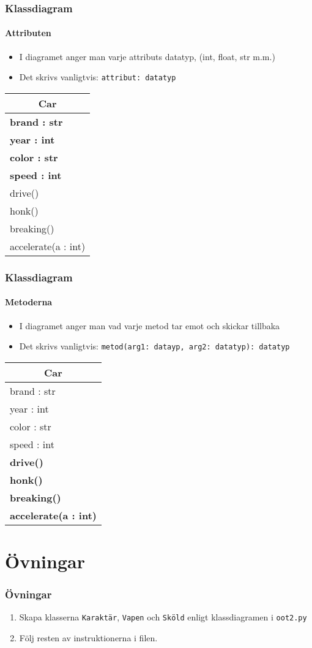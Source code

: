 \documentclass[aspectratio=169]{beamer}
\begin{document}
\begin{frame}
	\frametitle{Klassdiagram}
	\framesubtitle{Attributen}
	
	\begin{itemize}
		\item I diagramet anger man varje attributs datatyp, (int, float, str m.m.)
		\item Det skrivs vanligtvis: \texttt{attribut: datatyp}
	\end{itemize}
	
	\centering
	\begin{tabular}{|l|}
		\hline
		\multicolumn{1}{|c|}{\textbf{Car}} \\
		\hline
		\textbf{brand : str}\\
		\textbf{year : int}\\
		\textbf{color : str}\\
		\textbf{speed : int}\\ \hline
		drive() \\
		honk() \\
		breaking() \\
		accelerate(a : int)\\ \hline
	\end{tabular}
	

\end{frame}

\begin{frame}
	\frametitle{Klassdiagram}
	\framesubtitle{Metoderna}
	
	\begin{itemize}
		\item I diagramet anger man vad varje metod tar emot och skickar tillbaka
		\item Det skrivs vanligtvis: \texttt{metod(arg1: datayp, arg2: datatyp): datatyp}
	\end{itemize}
	
	\centering
	\begin{tabular}{|l|}
		\hline
		\multicolumn{1}{|c|}{\textbf{Car}} \\
		\hline
		brand : str\\
		year : int\\
		color : str\\
		speed : int\\ \hline
		\textbf{drive()} \\
		\textbf{honk()} \\
		\textbf{breaking()} \\
		\textbf{accelerate(a : int)}\\ \hline
	\end{tabular}
	

\end{frame}

\section{Övningar}

\begin{frame}
\frametitle{Övningar}

\begin{enumerate}
	\item Skapa klasserna \texttt{Karaktär}, \texttt{Vapen} och \texttt{Sköld} enligt klassdiagramen i \texttt{oot2.py}
	\item Följ resten av instruktionerna i filen.
\end{enumerate}

\end{frame}
\end{document}
